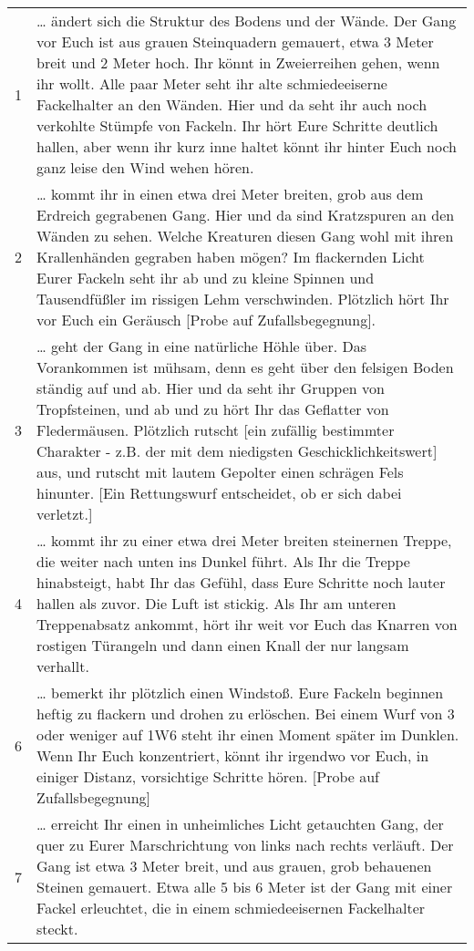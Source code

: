 \documentclass[11pt]{wbzine}
\begin{document}
\begin{tabularx}{\columnwidth}{cZ}
1  & \ldots{} ändert sich die Struktur des Bodens und der Wände. Der Gang
  vor Euch ist aus grauen Steinquadern gemauert, etwa 3 Meter breit und
  2 Meter hoch. Ihr könnt in Zweierreihen gehen, wenn ihr wollt. Alle
  paar Meter seht ihr alte schmiedeeiserne Fackelhalter an den Wänden.
  Hier und da seht ihr auch noch verkohlte Stümpfe von Fackeln. Ihr hört
  Eure Schritte deutlich hallen, aber wenn ihr kurz inne haltet könnt
  ihr hinter Euch noch ganz leise den Wind wehen hören.
\\
2 & \ldots{} kommt ihr in einen etwa drei Meter breiten, grob aus dem
  Erdreich gegrabenen Gang. Hier und da sind Kratzspuren an den Wänden
  zu sehen. Welche Kreaturen diesen Gang wohl mit ihren Krallenhänden
  gegraben haben mögen? Im flackernden Licht Eurer Fackeln seht ihr ab
  und zu kleine Spinnen und Tausendfüßler im rissigen Lehm verschwinden.
  Plötzlich hört Ihr vor Euch ein Geräusch [Probe auf
  Zufallsbegegnung].
\\
3 & \ldots{} geht der Gang in eine natürliche Höhle über. Das Vorankommen
  ist mühsam, denn es geht über den felsigen Boden ständig auf und ab.
  Hier und da seht ihr Gruppen von Tropfsteinen, und ab und zu hört Ihr
  das Geflatter von Fledermäusen. Plötzlich rutscht [ein zufällig
  bestimmter Charakter - z.B. der mit dem niedigsten
  Geschicklichkeitswert] aus, und rutscht mit lautem Gepolter einen
  schrägen Fels hinunter. [Ein Rettungswurf entscheidet, ob er sich dabei
  verletzt.]
\\
4 & \ldots{} kommt ihr zu einer etwa drei Meter breiten steinernen Treppe,
  die weiter nach unten ins Dunkel führt. Als Ihr die Treppe
  hinabsteigt, habt Ihr das Gefühl, dass Eure Schritte noch lauter
  hallen als zuvor. Die Luft ist stickig. Als Ihr am unteren
  Treppenabsatz ankommt, hört ihr weit vor Euch das Knarren von rostigen
  Türangeln und dann einen Knall der nur langsam verhallt.
\\
6 & \ldots{} bemerkt ihr plötzlich einen Windstoß. Eure Fackeln beginnen
  heftig zu flackern und drohen zu erlöschen. Bei einem Wurf von 3 oder
  weniger auf 1W6 steht ihr einen Moment später im Dunklen. Wenn Ihr
  Euch konzentriert, könnt ihr irgendwo vor Euch, in einiger Distanz,
  vorsichtige Schritte hören. [Probe auf Zufallsbegegnung]\\
7 & \ldots{} erreicht Ihr einen in unheimliches Licht getauchten Gang, der
  quer zu Eurer Marschrichtung von links nach rechts verläuft. Der Gang
  ist etwa 3 Meter breit, und aus grauen, grob behauenen Steinen
  gemauert. Etwa alle 5 bis 6 Meter ist der Gang mit einer Fackel
  erleuchtet, die in einem schmiedeeisernen Fackelhalter steckt.
  \\
\end{tabularx}
\end{document}
